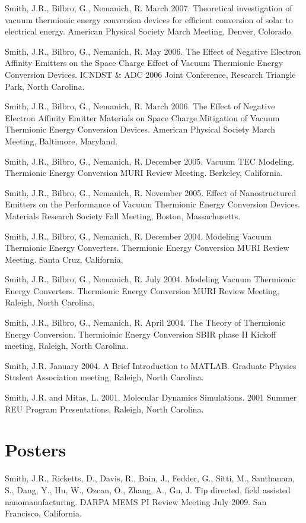 \documentclass[letterpaper,margin,line]{res}
\begin{document}
\begin{resume}
Smith, J.R., Bilbro, G., Nemanich, R. March 2007. Theoretical investigation of vacuum thermionic energy conversion devices for efficient conversion of solar to electrical energy. American Physical Society March Meeting, Denver, Colorado.

Smith, J.R., Bilbro, G., Nemanich, R. May 2006. The Effect of Negative Electron Affinity Emitters on the Space Charge Effect of Vacuum Thermionic Energy Conversion Devices. ICNDST \& ADC 2006 Joint Conference, Research Triangle Park, North Carolina.

Smith, J.R., Bilbro, G., Nemanich, R. March 2006. The Effect of Negative Electron Affinity Emitter Materials on Space Charge Mitigation of Vacuum Thermionic Energy Conversion Devices. American Physical Society March Meeting, Baltimore, Maryland.

Smith, J.R., Bilbro, G., Nemanich, R. December 2005. Vacuum TEC Modeling. Thermionic Energy Conversion MURI Review Meeting. Berkeley, California.

Smith, J.R., Bilbro, G., Nemanich, R. November 2005. Effect of Nanostructured Emitters on the Performance of Vacuum Thermionic Energy Conversion Devices. Materials Research Society Fall Meeting, Boston, Massachusetts.

Smith, J.R., Bilbro, G., Nemanich, R. December 2004. Modeling Vacuum Thermionic Energy Converters. Thermionic Energy Conversion MURI Review Meeting. Santa Cruz, California.

Smith, J.R., Bilbro, G., Nemanich, R. July 2004. Modeling Vacuum Thermionic Energy Converters. Thermionic Energy Conversion MURI Review Meeting, Raleigh, North Carolina.

Smith, J.R., Bilbro, G., Nemanich, R. April 2004. The Theory of Thermionic Energy Conversion. Thermioinic Energy Conversion SBIR phase II Kickoff meeting, Raleigh, North Carolina.

Smith, J.R. January 2004. A Brief Introduction to MATLAB. Graduate Physics Student Association meeting, Raleigh, North Carolina.

Smith, J.R. and Mitas, L. 2001. Molecular Dynamics Simulations. 2001 Summer REU Program Presentations, Raleigh, North Carolina.


\section{\sc Posters}
Smith, J.R., Ricketts, D., Davis, R., Bain, J., Fedder, G., Sitti, M., Santhanam, S., Dang, Y., Hu, W., Ozcan, O., Zhang, A., Gu, J. Tip directed, field assisted nanomanufacturing. DARPA MEMS PI Review Meeting July 2009. San Francisco, California.


\end{resume}
\end{document}
